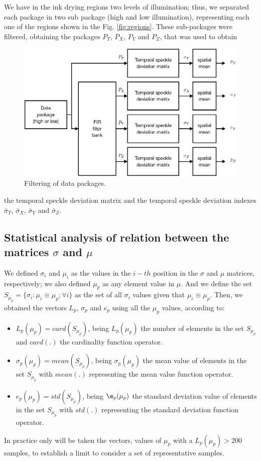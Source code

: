 \documentclass[review]{elsarticle}
\begin{document}
We have in the ink drying regions
two levels of illumination; thus, we  separated each package in two sub package
(high and low illumination), representing each one of the regions shown in the Fig. \ref{fig:regions}.
These sub-packages were filtered,
obtaining the packages $P_T$, $P_X$, $P_Y$ and $P_Z$, that was used to obtain
\begin{figure}[h!]
\centering
\includegraphics[width=0.65\columnwidth]{filtering.eps}
\caption{Filtering of data packages.}
\label{fig:filtering}
\end{figure}
the temporal speckle deviation matrix and the 
temporal speckle deviation indexes $\bar{\sigma}_T$, $\bar{\sigma}_X$, $\bar{\sigma}_Y$ and
$\bar{\sigma}_Z$.

\subsection{Statistical analysis of relation between the matrices $\sigma$ and $\mu$}
\label{subsec:statistical}
We defined $\sigma_i$ and $\mu_i$
as the values in the $i-th$ position in the $\sigma$  
and $\mu$ matrices, respectively; we also defined $\mu_p$
as any element value in  $\mu$.
And we define the set $S_{\mu_p}=\{\sigma_i: \mu_i\equiv \mu_p; \forall i\}$
as the set of all $\sigma_i$  values given that $\mu_i\equiv\mu_p$.
Then, we obtained the vectors $L_p$, $\sigma_p$ and
$e_p$ using all the $\mu_p$ values, according to:
\begin{itemize}
 \item $L_p(\mu_p)=card\left(S_{\mu_p}\right)$,  being $L_p(\mu_p)$ the number of elements
 in the set $S_{\mu_p}$ and $card(.)$ the cardinality function operator.
 \item $\sigma_p(\mu_p)=mean\left(S_{\mu_p}\right)$, being $\sigma_p(\mu_p)$
 the mean value of elements in the set $S_{\mu_p}$ with $mean(.)$ representing the mean value function operator.
 \item $e_p(\mu_p)=std\left(S_{\mu_p}\right)$, being $\e_p(\mu_p)$
 the standard  deviation value of elements in the set $S_{\mu_p}$ with $std(.)$ representing the standard deviation function operator.
\end{itemize}
In practice only will be taken the vectors, values of $\mu_p$
with a $L_p(\mu_p)>200$ samples, to establish a limit to consider a set of representative samples.
\end{document}
